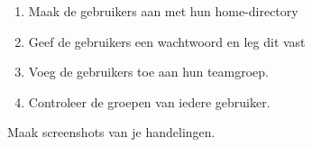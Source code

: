 \begin{enumerate}
\item Maak de gebruikers aan met hun home-directory
\item Geef de gebruikers een wachtwoord en leg dit vast
\item Voeg de gebruikers toe aan hun teamgroep.
\item Controleer de groepen van iedere gebruiker.
\end{enumerate}

Maak screenshots van je handelingen.

